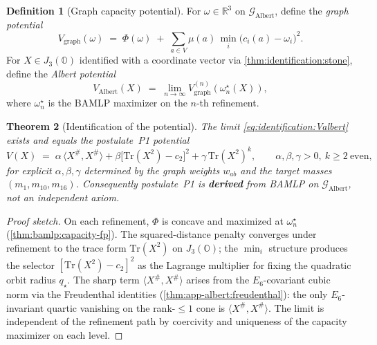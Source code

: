\documentclass[11pt]{article}
\theoremstyle{plain}
\newtheorem{theorem}{Theorem}[section]
\theoremstyle{definition}
\newtheorem{definition}[theorem]{Definition}
\theoremstyle{remark}
\begin{document}
\begin{definition}[Graph capacity potential]\label{def:identification:Vgraph}
For $\omega\in\mathbb{R}^3$ on $\mathcal{G}_{\mathrm{Albert}}$, define the
\emph{graph potential}
\begin{equation}
  V_{\mathrm{graph}}(\omega)\;=\;\Phi(\omega)\;+\;\sum_{a\in V}\mu(a)\,
  \min_i\bigl(c_i(a)-\omega_i\bigr)^2.
\end{equation}
For $X\in J_3(\mathbb{O})$ identified with a coordinate vector via
\autoref{thm:identification:stone}, define the \emph{Albert potential}
\begin{equation}
  V_{\mathrm{Albert}}(X)\;=\;\lim_{n\to\infty}V_{\mathrm{graph}}^{(n)}
  (\omega^\star_n(X)),
  \label{eq:identification:Valbert}
\end{equation}
where $\omega^\star_n$ is the BAMLP maximizer on the $n$-th refinement.
\end{definition}

\begin{theorem}[Identification of the potential]\label{thm:identification:potential}
The limit \eqref{eq:identification:Valbert} exists and equals the postulate~\textnormal{P1}
potential
\begin{equation}
  V(X)\;=\;\alpha\,\langle X^{\#},X^{\#}\rangle
  +\beta\bigl[\mathrm{Tr}(X^2)-c_2\bigr]^2
  +\gamma\,\mathrm{Tr}(X^2)^k,
  \qquad \alpha,\beta,\gamma>0,\ k\ge2\ \text{even},
\end{equation}
for explicit $\alpha,\beta,\gamma$ determined by the graph weights $w_{ab}$ and
the target masses $(m_1,m_{10},m_{16})$. Consequently postulate~\textnormal{P1}
is \textbf{derived} from BAMLP on $\mathcal{G}_{\mathrm{Albert}}$, not an
independent axiom.
\end{theorem}

\begin{proof}[Proof sketch]
On each refinement, $\Phi$ is concave and maximized at $\omega^\star_n$
(\autoref{thm:bamlp:capacity-fp}). The squared-distance penalty converges under
refinement to the trace form $\mathrm{Tr}(X^2)$ on $J_3(\mathbb{O})$; the
$\min_i$ structure produces the selector $[\mathrm{Tr}(X^2)-c_2]^2$ as the
Lagrange multiplier for fixing the quadratic orbit radius $q_\star$.
The sharp term $\langle X^{\#},X^{\#}\rangle$ arises from the
$E_6$-covariant cubic norm via the Freudenthal identities
(\autoref{thm:app-albert:freudenthal}): the only $E_6$-invariant quartic
vanishing on the rank-$\le1$ cone is $\langle X^{\#},X^{\#}\rangle$. The limit
is independent of the refinement path by coercivity and uniqueness of the
capacity maximizer on each level.
\end{proof}
\end{document}
